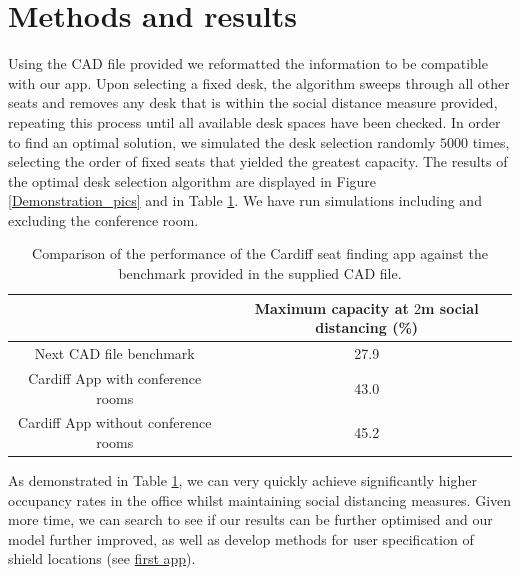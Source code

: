 \documentclass[11pt,a4paper]{article}
\begin{document}
\section*{Methods and results}
Using the CAD file provided we reformatted the information to be compatible with our app. Upon selecting a fixed desk, the algorithm sweeps through all other seats and removes any desk that is within the social distance measure provided, repeating this process until all available desk spaces have been checked. In order to find an optimal solution, we simulated the desk selection randomly $5000$ times, selecting the order of fixed seats that yielded the greatest capacity. The results of the optimal desk selection algorithm are displayed in Figure \ref{Demonstration_pics} and in Table \ref{tab:performance}.  We have run simulations including and excluding the conference room.







\begin{table}[ht!]
\begin{center}
 \begin{tabular}{|c |c|}
 \hline
& \textbf{Maximum capacity at $2$m social distancing (\%)}\\
 \hline
 Next CAD file benchmark &   27.9\\
 \hline
 Cardiff App  with conference rooms& 43.0\\
\hline
Cardiff App without conference rooms & 45.2\\
 \hline
\end{tabular}
\end{center}
\caption{Comparison of the performance of the Cardiff seat finding app against the benchmark provided in the supplied CAD file.}
\label{tab:performance}
\end{table}


As demonstrated in Table \ref{tab:performance}, we can very quickly achieve significantly higher occupancy rates in the office whilst maintaining social distancing measures. Given more time, we can search to see if our results can be further optimised and our model further improved, as well as develop methods for user specification of shield locations (see \href{https://lucyhenley.shinyapps.io/CardiffMATHBIO_NERCHackathonTwo_PublicTransport/}{first app}).
\end{document}
